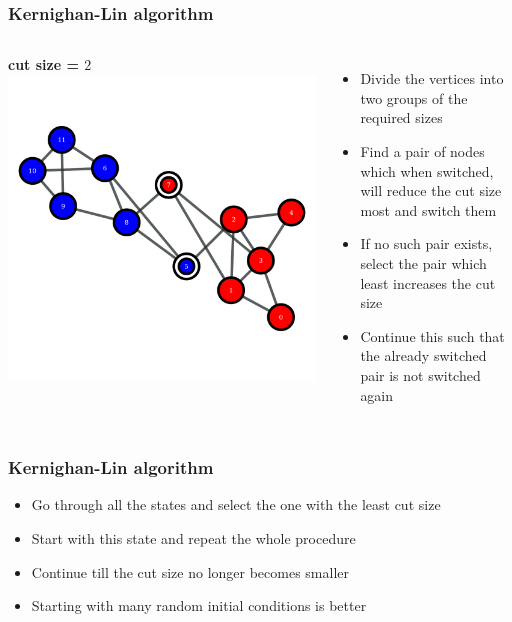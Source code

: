 \documentclass{beamer}
\begin{document}
\begin{frame}
    \frametitle{Kernighan-Lin algorithm}
    \begin{columns}
        \centering
        {\bf cut size = $2$}
        \includegraphics[width=0.8\columnwidth]{kl2.pdf}

        \centering
        \begin{itemize}
            \setlength\itemsep{1em}
            \item{\small Divide the vertices into two groups of the required sizes}
            \item{\small Find a pair of nodes which when switched, will reduce the cut size most and switch them}
                \pause
            \item{\small If no such pair exists, select the pair which least increases the cut size}
                \pause
            \item{\small Continue this such that the already switched pair is not switched again}
        \end{itemize}
    \end{columns}
\end{frame}
\begin{frame}
    \frametitle{Kernighan-Lin algorithm}
    \begin{itemize}
        \setlength\itemsep{1em}
        \item{Go through all the states and select the one with the least cut size}
        \item{Start with this state and repeat the whole procedure}
        \item{Continue till the cut size no longer becomes smaller}
        \item{Starting with many random initial conditions is better}
    \end{itemize}
\end{frame}
\end{document}
